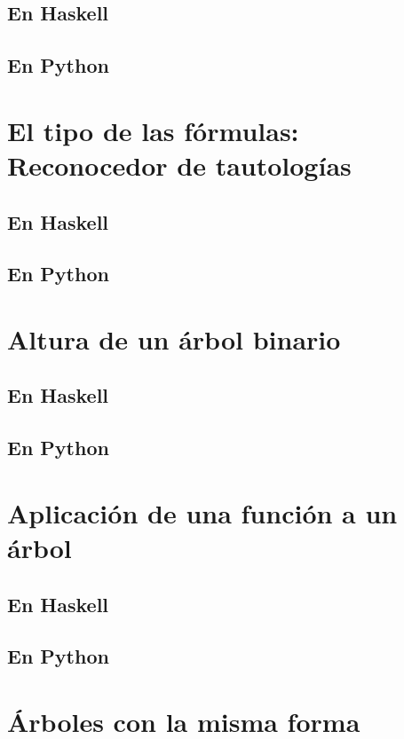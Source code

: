 \documentclass[a4paper,12pt,twoside]{book}
\begin{document}
\subsection*{En Haskell}
\subsection*{En Python}

\section{El tipo de las fórmulas: Reconocedor de tautologías}
\subsection*{En Haskell}
\subsection*{En Python}

\section{Altura de un árbol binario}
\subsection*{En Haskell}
\subsection*{En Python}

\section{Aplicación de una función a un árbol}
\subsection*{En Haskell}
\subsection*{En Python}

\section{Árboles con la misma forma}
\end{document}
